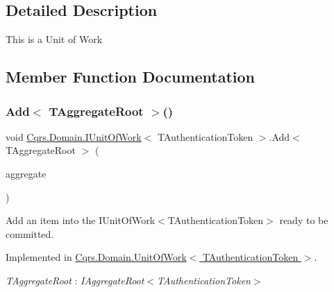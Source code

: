 \subsection{Detailed Description}
This is a Unit of Work 



\subsection{Member Function Documentation}
\mbox{\label{interfaceCqrs_1_1Domain_1_1IUnitOfWork_a786ebca85b4ef7294b98280230ef1397}} 
\subsubsection{\texorpdfstring{Add$<$ T\+Aggregate\+Root $>$()}{Add< TAggregateRoot >()}}
{\footnotesize\ttfamily void \hyperlink{interfaceCqrs_1_1Domain_1_1IUnitOfWork}{Cqrs.\+Domain.\+I\+Unit\+Of\+Work}$<$ T\+Authentication\+Token $>$.Add$<$ T\+Aggregate\+Root $>$ (\begin{DoxyParamCaption}\item[{T\+Aggregate\+Root}]{aggregate }\end{DoxyParamCaption})}



Add an item into the I\+Unit\+Of\+Work$<$\+T\+Authentication\+Token$>$ ready to be committed. 



Implemented in \hyperlink{classCqrs_1_1Domain_1_1UnitOfWork_a840214f97d3661c7b5a739df65fadc9f}{Cqrs.\+Domain.\+Unit\+Of\+Work$<$ T\+Authentication\+Token $>$}.

\begin{Desc}
\item[Type Constraints]\begin{description}
\item[{\em T\+Aggregate\+Root} : {\em I\+Aggregate\+Root$<$T\+Authentication\+Token$>$}]\end{description}
\end{Desc}
\mbox{\label{interfaceCqrs_1_1Domain_1_1IUnitOfWork_ade600c9bf9e8380c24eaf1e7e0df6e01}} 
